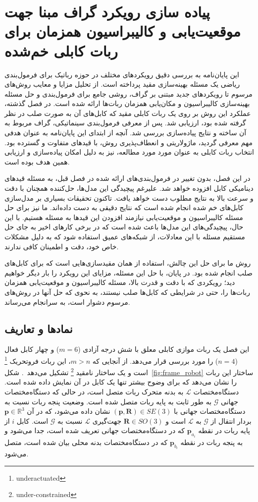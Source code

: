 \chapter{پیاده سازی رویکرد گراف مبنا جهت موقعیت‌یابی و کالیبراسیون همزمان برای ربات کابلی خم‌شده}
این پایان‌نامه به بررسی دقیق رویکردهای مختلف در حوزه رباتیک برای فرمول‌بندی ریاضی یک مسئله بهینه‌سازی مقید پرداخته است. از تحلیل مزایا و معایب روش‌های مرسوم تا رویکردهای جدید مبتنی بر گراف، روشی جامع برای فرمول‌بندی و حل مسئله بهینه‌سازی کالیبراسیون و مکان‌یابی همزمان ربات‌ها ارائه شده است. در فصل گذشته، عملکرد این روش بر روی یک ربات کابلی مقید که کابل‌های آن به صورت صلب در نظر گرفته شده بود، ارزیابی شد. پس از معرفی فرمول‌بندی سینماتیکی، گراف مربوط به آن ساخته و نتایج پیاده‌سازی بررسی شد. آنچه از ابتدای این پایان‌نامه به عنوان هدفی مهم معرفی گردید، ماژولاریتی و انعطاف‌پذیری روش، با قیدهای متفاوت و گسترده بود. انتخاب ربات کابلی به عنوان مورد مورد مطالعه، نیز به دلیل امکان پیاده‌سازی و ارزیابی همین هدف بوده است.

در این فصل، بدون تغییر در فرمول‌بندی‌های ارائه شده در فصل قبل، به مسئله قیدهای دینامیکی کابل افزوده خواهد شد. علیرغم پیچیدگی این مدل‌ها، حل‌کننده همچنان با دقت و سرعت بالا به نتایج مطلوب دست خواهد یافت. تاکنون تحقیقات بسیاری بر مدل‌سازی کابل‌های خم شده انجام شده است که نتایج دقیقی به دست داده‌اند. ما نیز برای حل مسئله کالیبراسیون و موقعیت‌یابی نیازمند افزودن این قیدها به مسئله هستیم. با این حال، پیچیدگی‌های این مدل‌ها باعث شده است که در برخی کارهای اخیر به جای حل مستقیم مسئله با این معادلات، از شبکه‌های عمیق استفاده شود که به دلیل مشکلات خاص خود، دقت و اطمینان کافی ندارند.

روش ما برای حل این چالش، استفاده از همان مقیدسازی‌هایی است که برای کابل‌های صلب انجام شده بود. در پایان، با حل این مسئله، مزایای این رویکرد را بار دیگر خواهیم دید؛ رویکردی که با دقت و قدرت بالا، مسئله کالیبراسیون و موقعیت‌یابی همزمان ربات‌ها را، حتی در شرایطی که کابل‌ها صلب نیستند، به نحوی که حل آنها در روش‌های مرسوم دشوار است، به سرانجام می‌رساند.



\section{نمادها و تعاریف} \label{subsec:Assm}
این فصل یک ربات موازی کابلی معلق با شش درجه آزادی ($m=6$) و چهار کابل فعال ($n=4$) را مورد بررسی قرار می‌دهد. از آنجایی که $m>n$، این ربات فروتحریک
\footnote{underactuated}
 است و یک ساختار نامقید
\footnote{under-constrained}
تشکیل می‌دهد~\cite{ida2021natural}. 
شکل~\ref{fig:frame_robot} ساختار این ربات را نشان می‌دهد که برای وضوح بیشتر تنها یک کابل در آن نمایش داده شده است. 
دستگاه‌مختصات $\mathcal{L}$ به بدنه متحرک ربات متصل است، در حالی که دستگاه‌مختصات جهانی $\mathcal{G}$ به طور ثابت به پایه ربات متصل شده است. وضعیت پنجه ربات نسبت به دستگاه‌مختصات جهانی با
 $(\bm{p},\bm{R}) \in SE(3)$
نشان داده می‌شود، که در آن
 $\bm{p} \in \mathbb{R}^3$
بردار انتقال از $\mathcal{G}$ به $\mathcal{L}$ است و
 $\bm{R} \in SO(3)$
جهت‌گیری $\mathcal{L}$ نسبت به $\mathcal{G}$ است. کابل $i$ از پایه ربات در نقطه $\bm{p}_{a_i}$ که در دستگاه‌مختصات جهانی تعریف شده است، جدا می‌شود و به پنجه ربات در نقطه $\bm{p}_{b_i}$ که در دستگاه‌مختصات بدنه محلی بیان شده است، متصل می‌شود.

